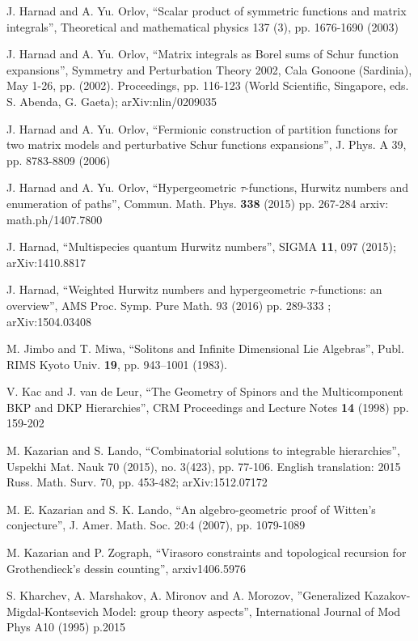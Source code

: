 \documentclass[a4paper,10pt]{article}
\theoremstyle{plain}
\theoremstyle{remark}
\begin{document}
\begin{thebibliography}{99}
  J. Harnad and A. Yu. Orlov, ``Scalar product of symmetric functions and matrix integrals'',
Theoretical and mathematical physics 137 (3), pp. 1676-1690  (2003)

  J. Harnad and A. Yu. Orlov, ``Matrix integrals as Borel sums of Schur function expansions'',
 Symmetry and Perturbation Theory 2002, Cala Gonoone (Sardinia), May 1-26, pp.   (2002). Proceedings, pp. 116-123
 (World Scientific, Singapore, eds. S. Abenda, G. Gaeta); arXiv:nlin/0209035
   
  J. Harnad and A. Yu. Orlov, ``Fermionic construction of partition functions for two matrix models
and perturbative Schur functions expansions'', J. Phys. A 39, pp. 8783-8809 (2006)
   
   
 J. Harnad and A. Yu. Orlov, ``Hypergeometric $\tau$-functions, Hurwitz numbers and enumeration of paths'',
Commun. Math. Phys. {\bf 338} (2015) pp. 267-284
arxiv: math.ph/1407.7800

 J. Harnad,
``Multispecies quantum Hurwitz numbers'',  SIGMA {\bf 11}, 097 (2015); arXiv:1410.8817

 J. Harnad,
``Weighted Hurwitz numbers and hypergeometric $\tau$-functions: an overview'', AMS
 Proc. Symp. Pure Math. 93 (2016) pp. 289-333   ; arXiv:1504.03408

  
 M. Jimbo and T. Miwa, ``Solitons and Infinite
Dimensional Lie Algebras'', { Publ. RIMS Kyoto Univ.}
{\bf 19}, pp. 943--1001  (1983).


 V. Kac and J. van de Leur,
``The Geometry of Spinors and the Multicomponent BKP and DKP
Hierarchies'', CRM Proceedings and Lecture Notes {\bf 14}  (1998) pp.
159-202

  
      M. Kazarian and S. Lando,
    ``Combinatorial solutions to integrable hierarchies'',
     Uspekhi Mat. Nauk 70 (2015), no. 3(423), pp. 77-106. English translation: 2015 Russ. Math. Surv. 70, pp. 453-482;
 arXiv:1512.07172

   M.  E.  Kazarian  and  S.  K.  Lando,
``An   algebro-geometric   proof   of Witten's   conjecture'',
J. Amer. Math. Soc. 20:4 (2007), pp. 1079-1089

  
 M. Kazarian and P. Zograph,  ``Virasoro constraints and topological recursion for Grothendieck's dessin counting'',
 arxiv{1406.5976}

 
  S. Kharchev, A. Marshakov, A. Mironov and A. Morozov,
  ''Generalized Kazakov-Migdal-Kontsevich Model: group theory aspects'', International Journal of Mod Phys A10 (1995) p.2015


\end{thebibliography}
\end{document}
